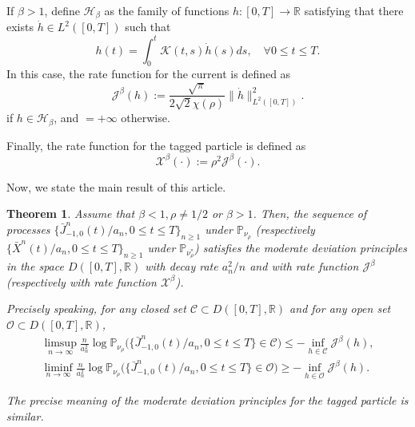 \documentclass[reqno,11pt]{amsart}
\numberwithin{equation}{section}
\newtheorem{theorem}{Theorem}[section]
\newcommand{\R}{\mathbb{R}}
\begin{document}
If $\beta > 1$, define $\mathcal{H}_\beta$ as the family of functions $h: [0,T] \rightarrow \R$ satisfying that there exists $\dot{h} \in L^2 ([0,T])$ such that
\[h (t) = \int_0^t \mathcal{K}(t,s) \dot{h} (s) ds, \quad \forall 0 \leq t \leq T.\]
In this case, the rate function for the current is defined as
	\[\mathcal{J}^\beta (h):= 	\frac{\sqrt{\pi}}{2  \sqrt{2} \chi(\rho)}  \|\dot{h}\|_{L^2 ([0,T])}^2.\]
if $h \in \mathcal{H}_\beta$, and $= + \infty$ otherwise. 

Finally, the rate function for the tagged particle is defined as
 \[\mathcal{X}^\beta (\cdot) := \rho^2 \mathcal{J}^\beta (\cdot).\]



Now, we state the main result of this article. 

\begin{theorem}\label{thm mdp current tagged particle} Assume that $\beta < 1, \rho \neq 1/2$ or $\beta > 1$. Then, the sequence  of processes $\{\bar{J}^n_{-1,0} (t)/a_n, 0 \leq t \leq T \}_{n \geq 1}$ under $\mathbb{P}_{\nu_{\rho}}$  (respectively $\{\bar{X}^n (t)/a_n, 0 \leq t \leq T \}_{n \geq 1}$ under $\mathbb{P}_{\nu_{\rho}^*}$) satisfies the moderate deviation principles in the space $D([0,T], \R)$ with decay rate $a_n^2/n$ and with rate function $\mathcal{J}^\beta$ (respectively with rate function $\mathcal{X}^\beta$). 	
	
Precisely speaking, for any closed set $\mathcal{C} \subset D([0,T], \R)$ and for any open set $\mathcal{O} \subset D([0,T],\R)$,
	\begin{align*}
		\limsup_{n \rightarrow \infty} \frac{n}{a_n^2} \log \mathbb{P}_{\nu_{\rho}} \Big(\{\bar{J}^n_{-1,0} (t)/a_n, 0 \leq t \leq T \} \in \mathcal{C}\Big) \leq - \inf_{h \in \mathcal{C}} \mathcal{J}^\beta (h),\\
		\liminf_{n \rightarrow \infty} \frac{n}{a_n^2} \log \mathbb{P}_{\nu_{\rho}} \Big(\{\bar{J}^n_{-1,0} (t)/a_n, 0 \leq t \leq T \} \in \mathcal{O}\Big) \geq - \inf_{h \in \mathcal{O}} \mathcal{J}^\beta (h).
	\end{align*}

	The precise meaning of the moderate deviation principles for the tagged particle is similar.
\end{theorem}
\end{document}

